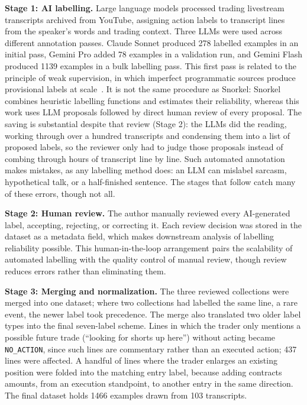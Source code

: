 \textbf{Stage 1: AI labelling.} Large language models processed trading livestream transcripts archived from YouTube, assigning action labels to transcript lines from the speaker's words and trading context. Three LLMs were used across different annotation passes. Claude Sonnet produced 278 labelled examples in an initial pass, Gemini Pro added 78 examples in a validation run, and Gemini Flash produced 1139 examples in a bulk labelling pass. This first pass is related to the principle of weak supervision, in which imperfect programmatic sources produce provisional labels at scale~\cite{ratner2017snorkel}. It is not the same procedure as Snorkel: Snorkel combines heuristic labelling functions and estimates their reliability, whereas this work uses LLM proposals followed by direct human review of every proposal. The saving is substantial despite that review (Stage 2): the LLMs did the reading, working through over a hundred transcripts and condensing them into a list of proposed labels, so the reviewer only had to judge those proposals instead of combing through hours of transcript line by line. Such automated annotation makes mistakes, as any labelling method does: an LLM can mislabel sarcasm, hypothetical talk, or a half-finished sentence. The stages that follow catch many of these errors, though not all.

\textbf{Stage 2: Human review.} The author manually reviewed every AI-generated label, accepting, rejecting, or correcting it. Each review decision was stored in the dataset as a metadata field, which makes downstream analysis of labelling reliability possible. This human-in-the-loop arrangement pairs the scalability of automated labelling with the quality control of manual review, though review reduces errors rather than eliminating them.

\textbf{Stage 3: Merging and normalization.} The three reviewed collections were merged into one dataset; where two collections had labelled the same line, a rare event, the newer label took precedence. The merge also translated two older label types into the final seven-label scheme. Lines in which the trader only mentions a possible future trade (``looking for shorts up here'') without acting became \texttt{NO\_ACTION}, since such lines are commentary rather than an executed action; 437 lines were affected. A handful of lines where the trader enlarges an existing position were folded into the matching entry label, because adding contracts amounts, from an execution standpoint, to another entry in the same direction. The final dataset holds 1466 examples drawn from 103 transcripts.

